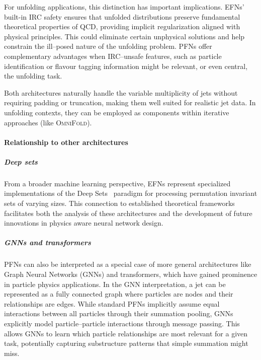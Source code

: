         For unfolding applications, this distinction has important implications.
        EFNs' built-in IRC safety ensures that unfolded distributions preserve fundamental theoretical properties of QCD, providing implicit regularization aligned with physical principles.
        This could eliminate certain unphysical solutions and help constrain the ill--posed nature of the unfolding problem.
        PFNs offer complementary advantages when IRC--unsafe features, such as particle identification or flavour tagging information might be relevant, or even central, the unfolding task.
        
        Both architectures naturally handle the variable multiplicity of jets without requiring padding or truncation, making them well suited for realistic jet data.
        In unfolding contexts, they can be employed as components within iterative approaches (like \textsc{OmniFold}).

        \paragraph{Relationship to other architectures}
            \subparagraph{Deep sets}
                From a broader machine learning perspective, EFNs represent specialized implementations of the Deep Sets~\cite{Sauer2023MeasurementCollider} paradigm for processing permutation invariant sets of varying sizes.
                This connection to established theoretical frameworks facilitates both the analysis of these architectures and the development of future innovations in physics aware neural network design.
            \subparagraph{GNNs and transformers}
            \label{subpar:pfns-gnns-and-transformers}
                    PFNs can also be interpreted as a special case of more general architectures like Graph Neural Networks (GNNs) and transformers, which have gained prominence in particle physics applications.
                    In the GNN interpretation, a jet can be represented as a fully connected graph where particles are nodes and their relationships are edges.
                    While standard PFNs implicitly assume equal interactions between all particles through their summation pooling, GNNs explicitly model particle--particle interactions through message passing.
                    This allows GNNs to learn which particle relationships are most relevant for a given task, potentially capturing substructure patterns that simple summation might miss.
                    
